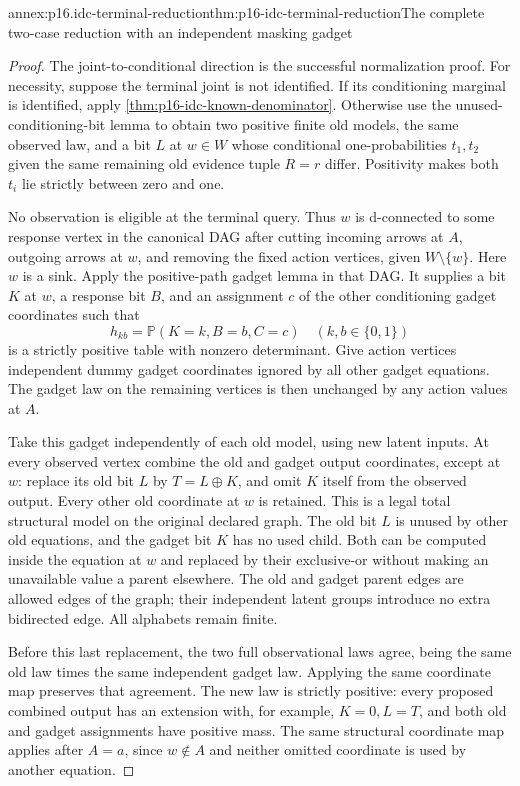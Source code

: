 \begin{annexitem}{annex:p16.idc-terminal-reduction}{thm:p16-idc-terminal-reduction}{The complete two-case reduction with an independent masking gadget}
\begin{proof}
The joint-to-conditional direction is the successful normalization
proof. For necessity, suppose the terminal joint is not identified.
If its conditioning marginal is identified, apply
\cref{thm:p16-idc-known-denominator}. Otherwise use the unused-
conditioning-bit lemma to obtain two positive finite old models,
the same observed law, and a bit \(L\) at \(w\in W\)
whose conditional one-probabilities \(t_1,t_2\) given the same
remaining old evidence tuple \(R=r\) differ. Positivity makes
both \(t_i\) lie strictly between zero and one.

No observation is eligible at the terminal query. Thus \(w\)
is d-connected to some response vertex in the canonical DAG
after cutting incoming arrows at \(A\), outgoing arrows at
\(w\), and removing the fixed action vertices, given
\(W\setminus\{w\}\). Here \(w\) is a sink. Apply the
positive-path gadget lemma in that DAG. It supplies a bit \(K\)
at \(w\), a response bit \(B\), and an assignment \(c\)
of the other conditioning gadget coordinates such that
\[
 h_{kb}=\mathbb P(K=k,B=b,C=c)
 \quad(k,b\in\{0,1\})
\]
is a strictly positive table with nonzero determinant. Give action
vertices independent dummy gadget coordinates ignored by all other
gadget equations. The gadget law on the remaining vertices is
then unchanged by any action values at \(A\).

Take this gadget independently of each old model, using new latent
inputs. At every observed vertex combine the old and gadget output
coordinates, except at \(w\): replace its old bit \(L\)
by \(T=L\oplus K\), and omit \(K\) itself from the
observed output. Every other old coordinate at \(w\) is retained.
This is a legal total structural model on the original declared
graph. The old bit \(L\) is unused by other old equations,
and the gadget bit \(K\) has no used child. Both can be
computed inside the equation at \(w\) and replaced by their
exclusive-or without making an unavailable value a parent elsewhere.
The old and gadget parent edges are allowed edges of the graph;
their independent latent groups introduce no extra bidirected edge.
All alphabets remain finite.

Before this last replacement, the two full observational laws agree,
being the same old law times the same independent gadget law.
Applying the same coordinate map preserves that agreement. The
new law is strictly positive: every proposed combined output has
an extension with, for example, \(K=0,L=T\), and both old
and gadget assignments have positive mass. The same structural
coordinate map applies after \(A=a\), since \(w\notin A\)
and neither omitted coordinate is used by another equation.


\end{proof}
\end{annexitem}
